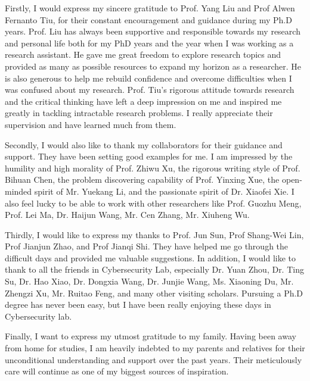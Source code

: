 Firstly, I would express my sincere gratitude to Prof. Yang Liu and Prof Alwen Fernanto Tiu, for their constant encouragement and guidance during my Ph.D years. Prof. Liu has always been supportive and responsible towards my research and personal life both for my PhD years and the year when I was working as a research assistant. He gave me great freedom to explore research topics and provided as many as possible resources to expand my horizon as a researcher. He is also generous to help me rebuild confidence and overcome difficulties when I was confused about my research. Prof. Tiu's rigorous attitude towards research and the critical thinking have left a deep impression on me and inspired me greatly in tackling intractable research problems. I really appreciate their supervision and have learned much from them.

Secondly, I would also like to thank my collaborators for their guidance and support. They have been setting good examples for me. I am impressed by the humility and high morality of Prof. Zhiwu Xu, the rigorous writing style of Prof. Bihuan Chen, the problem discovering capability of Prof. Yinxing Xue, the open-minded spirit of Mr. Yuekang Li, and the passionate spirit of Dr. Xiaofei Xie. I also feel lucky to be able to work with other researchers like Prof. Guozhu Meng, Prof. Lei Ma, Dr. Haijun Wang, Mr. Cen Zhang, Mr. Xiuheng Wu.

Thirdly, I would like to express my thanks to Prof. Jun Sun, Prof Shang-Wei Lin, Prof Jianjun Zhao, and Prof Jianqi Shi. They have helped me go through the difficult days and provided me valuable suggestions. In addition, I would like to thank to all the friends in Cybersecurity Lab, especially Dr. Yuan Zhou, Dr. Ting Su, Dr. Hao Xiao, Dr. Dongxia Wang, Dr. Junjie Wang, Ms. Xiaoning Du, Mr. Zhengzi Xu, Mr. Ruitao Feng, and many other visiting scholars. Pursuing a Ph.D degree has never been easy, but I have been really enjoying these days in Cybersecurity lab.

Finally, I want to express my utmost gratitude to my family. Having been away from home for studies, I am heavily indebted to my parents and relatives for their unconditional understanding and support over the past years. Their meticulously care will continue as one of my biggest sources of inspiration.